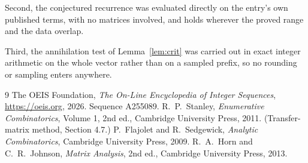 \documentclass[11pt,a4paper]{article}
\theoremstyle{plain}
\theoremstyle{definition}
\begin{document}
Second, the conjectured recurrence was evaluated directly on the entry's own published terms,
with no matrices involved, and holds wherever the proved range and the data overlap.

Third, the annihilation test of Lemma~\ref{lem:crit} was carried out in exact integer
arithmetic on the whole vector rather than on a sampled prefix, so no rounding or sampling
enters anywhere.

\begin{thebibliography}{9}
 The OEIS Foundation, \emph{The On-Line Encyclopedia of Integer
Sequences}, \url{https://oeis.org}, 2026. Sequence A255089.
 R.~P.~Stanley, \emph{Enumerative Combinatorics}, Volume 1, 2nd ed.,
Cambridge University Press, 2011. (Transfer-matrix method, Section 4.7.)
 P.~Flajolet and R.~Sedgewick, \emph{Analytic Combinatorics}, Cambridge
University Press, 2009.
 R.~A.~Horn and C.~R.~Johnson, \emph{Matrix Analysis}, 2nd ed., Cambridge
University Press, 2013.
\end{thebibliography}
\end{document}
